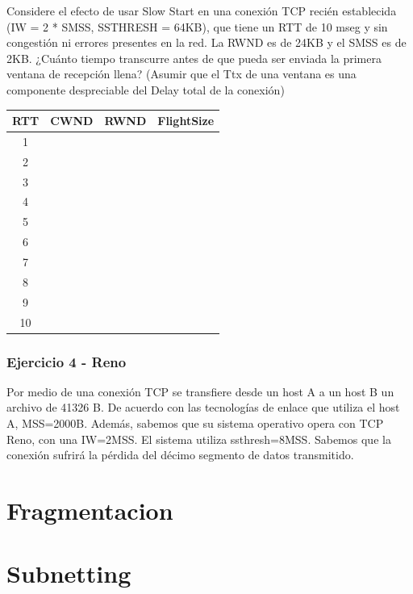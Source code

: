 \documentclass[titlepage,a4paper]{article}
\begin{document}
Considere el efecto de usar Slow Start en una conexión TCP recién establecida (IW = 2 * SMSS, SSTHRESH = 64KB), que tiene un RTT de 10 mseg y sin congestión ni errores presentes en la red. La RWND es de 24KB y el SMSS es de 2KB. ¿Cuánto tiempo transcurre antes de que pueda ser enviada la primera ventana de recepción llena? (Asumir que el Ttx de una ventana es una componente despreciable del Delay total de la conexión)


\begin{center}
    \begin{tabular}{c|c|c|c}
        RTT & CWND & RWND & FlightSize \\
        \hline
        \hline
        1 & & & \\
         \hline
        2 & & & \\
         \hline
        3 & & & \\
         \hline
        4 & & & \\
         \hline
        5 & & & \\
         \hline
        6 & & & \\
         \hline
        7 & & & \\
         \hline
        8 & & & \\
         \hline
        9 & & & \\
         \hline
        10 & & & \\
    \end{tabular}
\end{center}


\subsubsection{Ejercicio 4 - Reno}

Por medio de una conexión TCP se transfiere desde un host A a un host B un archivo de 41326 B. De acuerdo con las tecnologías de enlace que utiliza el host A, MSS=2000B. Además, sabemos que su sistema operativo opera con TCP Reno, con una IW=2MSS. El sistema utiliza ssthresh=8MSS. Sabemos que la conexión sufrirá la pérdida del décimo segmento de datos transmitido.

\section{Fragmentacion}\label{sec:fragmentacion}



\section{Subnetting}\label{sec:subnetting}
\end{document}
